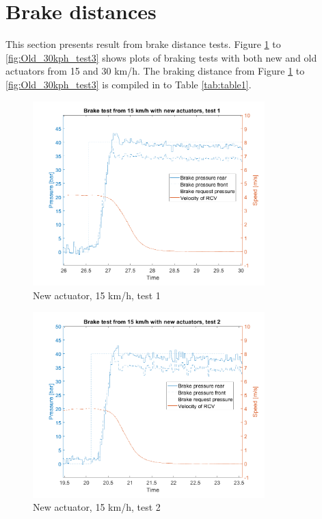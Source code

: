 \documentclass[a4paper,11pt]{kth-mag}
\begin{document}
\section{Brake distances}
This section presents result from brake distance tests. Figure \ref{fig:New_15kph_test1} to \ref{fig:Old_30kph_test3} shows plots of braking tests with both new and old actuators from 15 and 30 km/h. 
The braking distance from Figure \ref{fig:New_15kph_test1} to \ref{fig:Old_30kph_test3} is compiled in to Table \ref{tab:table1}.


\begin{figure}[h]
\centering
\includegraphics[width=0.8\textwidth]{New_15kph_test1}
\caption{New actuator, 15 km/h, test 1}
\label{fig:New_15kph_test1}
\end{figure}

\begin{figure}[h]
\centering
\includegraphics[width=0.8\textwidth]{New_15kph_test2}
\caption{New actuator, 15 km/h, test 2}
\label{fig:New_15kph_test2}
\end{figure}
\end{document}
